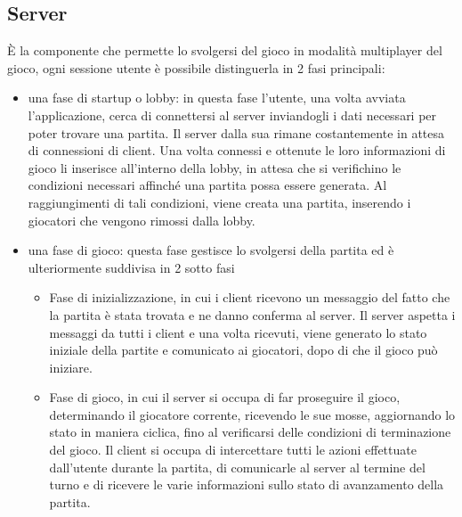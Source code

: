 \subsection{Server}
È la componente che permette lo svolgersi del gioco in modalità multiplayer del gioco, ogni sessione utente è possibile distinguerla in 2 fasi principali:
\begin{itemize}
    \item una fase di startup o lobby: in questa fase l’utente, una volta avviata l’applicazione, cerca di connettersi al server inviandogli i dati necessari per poter trovare una partita.
    Il server dalla sua rimane costantemente in attesa di connessioni di client.
    Una volta connessi e ottenute le loro informazioni di gioco li inserisce all’interno della lobby, in attesa che si verifichino le condizioni necessari affinché una partita possa essere generata.
    Al raggiungimenti di tali condizioni, viene creata una partita, inserendo i giocatori che vengono rimossi dalla lobby.
    \item una fase di gioco: questa fase gestisce lo svolgersi della partita ed è ulteriormente suddivisa in 2 sotto fasi
    \begin{itemize}
        \item Fase di inizializzazione, in cui i client ricevono un messaggio del fatto che la partita è stata trovata e ne danno conferma al server.
        Il server aspetta i messaggi da tutti i client e una volta ricevuti, viene generato lo stato iniziale della partite e comunicato ai giocatori, dopo di che il gioco può iniziare.
        \item Fase di gioco, in cui il server si occupa di far proseguire il gioco, determinando il giocatore corrente, ricevendo le sue mosse, aggiornando lo stato in maniera ciclica, fino al verificarsi delle condizioni di terminazione del gioco.
        Il client si occupa di intercettare tutti le azioni effettuate dall’utente durante la partita, di comunicarle al server al termine del turno e di ricevere le varie informazioni sullo stato di avanzamento della partita.
    \end{itemize}
\end{itemize}

